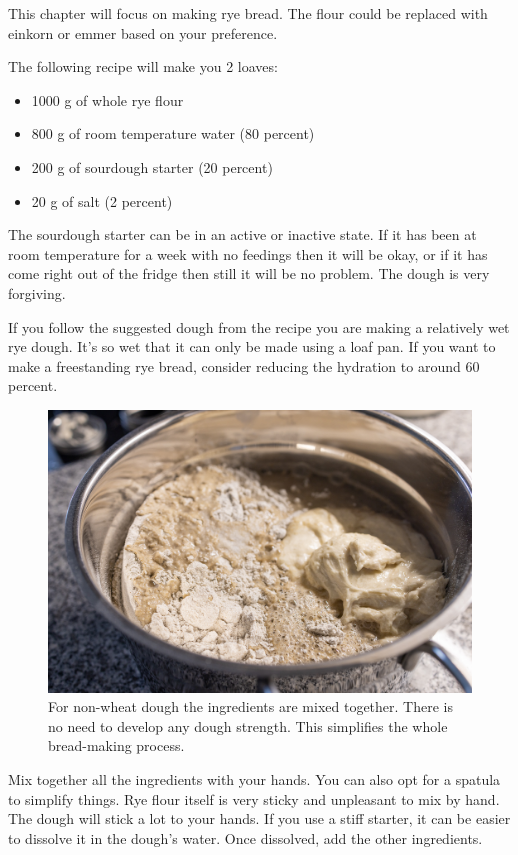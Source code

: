 This chapter will focus on making rye bread. The flour could
be replaced with einkorn or emmer based on your preference.

The following recipe will make you 2 loaves:
\begin{itemize}
  \item 1000 g of whole rye flour
  \item 800 g of room temperature water (80 percent)
  \item 200 g of sourdough starter (20 percent)
  \item 20 g of salt (2 percent)
\end{itemize}

The sourdough starter can be in an active or inactive state. If it has been
at room temperature for a week with no feedings then it will be okay, or 
if it has come right out of the fridge then still it will be no problem.
The dough is very forgiving.

If you follow the suggested dough from the recipe you are making a relatively
wet rye dough. It's so wet that it can only be made using a loaf pan. If
you want to make a freestanding rye bread, consider reducing the hydration
to around 60 percent.

\begin{figure}[!htb]
  \includegraphics[width=\textwidth]{ingredients}
  \caption{For non-wheat dough the ingredients are mixed together. There is no need
  to develop any dough strength. This simplifies the whole bread-making process.}
  \label{fig:non-wheat-ingredients}
\end{figure}

Mix together all the ingredients with your hands. You can also
opt for a spatula to simplify things. Rye flour itself is very
sticky and unpleasant to mix by hand. The dough will stick
a lot to your hands. If you use a stiff starter, it can be
easier to dissolve it in the dough's water. Once dissolved,
add the other ingredients.

